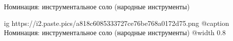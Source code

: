  
 
 
 
 

Номинация: инструментальное соло (народные инструменты)

\ifcmt
  ig https://i2.paste.pics/a818c6085333727ce76be768a0172d75.png
  @caption Номинация: инструментальное соло (народные инструменты)
	@width 0.8
\fi
